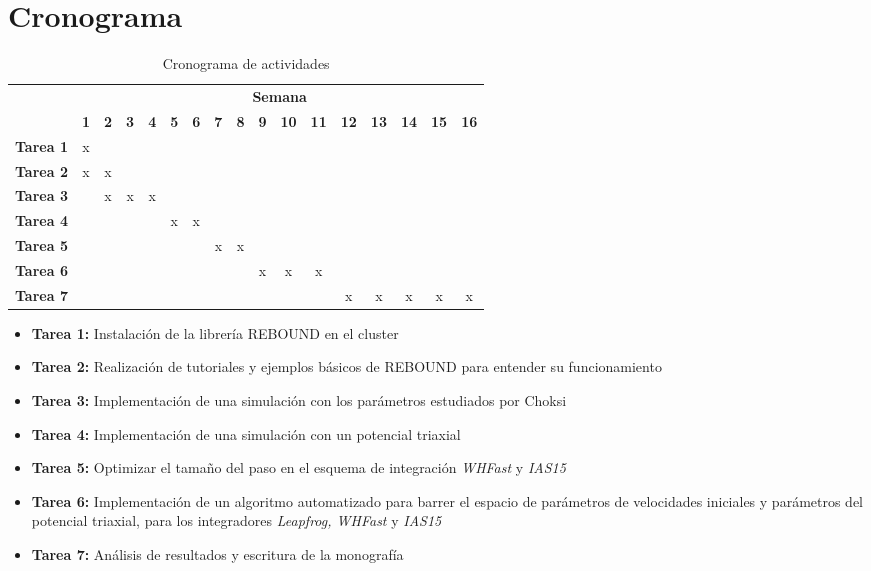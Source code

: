 \section{Cronograma}
	\begin{table}[h]
		\centering
		\caption{Cronograma de actividades}
		\label{tb: cronograma}
		\footnotesize
		\begin{tabular}{|c|c|c|c|c|c|c|c|c|c|c|c|c|c|c|c|c|}
			\hline
			\rowcolor[HTML]{C0C0C0} 
			\cellcolor[HTML]{C0C0C0}                                       & \multicolumn{16}{c|}{\cellcolor[HTML]{C0C0C0}\textbf{Semana}} \\ \cline{2-17} 
			\rowcolor[HTML]{EFEFEF} 
			\multirow{-2}{*}{\cellcolor[HTML]{C0C0C0}\textbf{Actividades}} & \textbf{1} & \textbf{2} & \textbf{3} & \textbf{4} & \textbf{5} & \textbf{6} & \textbf{7} & \textbf{8} & \textbf{9} & \textbf{10} & \textbf{11} & \textbf{12} & \textbf{13} & \textbf{14} & \textbf{15} & \textbf{16} \\ \hline
			\cellcolor[HTML]{EFEFEF}
			\textbf{Tarea 1} & x & & & & & & & & & & & & & & & \\ \hline
			\cellcolor[HTML]{EFEFEF}
			\textbf{Tarea 2} & x & x & & & & & & & & & & & & & & \\ \hline
			\cellcolor[HTML]{EFEFEF}
			\textbf{Tarea 3} & & x & x & x & & & & & & & & & & & & \\ \hline
			\cellcolor[HTML]{EFEFEF}
			\textbf{Tarea 4} & & & & & x & x & & & & & & & & & & \\ \hline
			\cellcolor[HTML]{EFEFEF}
			\textbf{Tarea 5} & & & & & & & x & x & & & & & & & & \\ \hline
			\cellcolor[HTML]{EFEFEF}
			\textbf{Tarea 6} & & & & & & & & & x & x & x & & & & & \\ \hline
			\cellcolor[HTML]{EFEFEF}
			\textbf{Tarea 7} & & & & & & & & & & & & x & x & x & x & x \\ \hline
		\end{tabular}
	\end{table}
	\begin{itemize}
		\item \textbf{Tarea 1:} Instalaci\'on de la librer\'ia REBOUND en el cluster
		\item \textbf{Tarea 2:} Realización de tutoriales y ejemplos básicos de REBOUND para entender su funcionamiento
		\item \textbf{Tarea 3:} Implementación de una simulación con los par\'ametros estudiados por Choksi \cite{choksi2017recoiling}
		\item \textbf{Tarea 4:} Implementaci\'on de una simulaci\'on con un potencial triaxial
		\item \textbf{Tarea 5:} Optimizar el tama\~no del paso en el esquema de integraci\'on \textit{WHFast} y \textit{IAS15}
		\item \textbf{Tarea 6:} Implementaci\'on de un algoritmo automatizado para barrer el espacio de par\'ametros de velocidades iniciales y par\'ametros del potencial triaxial, para los integradores \textit{Leapfrog, WHFast} y \textit{IAS15}
		\item \textbf{Tarea 7:} An\'alisis de resultados y escritura de la monograf\'ia
		
	\end{itemize}